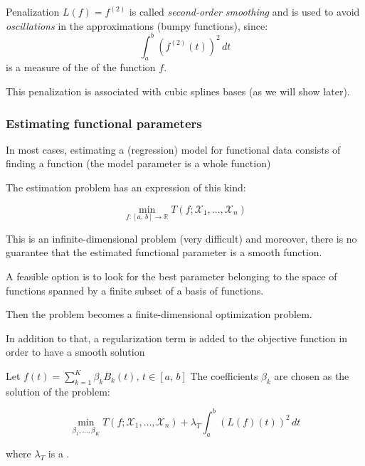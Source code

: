 Penalization $L(f) = f^{(2)}$ is called \emph{second-order smoothing} and
is used to avoid \emph{oscillations} in the approximations (bumpy functions),
since:
\begin{equation*}
    \int_{a}^{b} \left(
        f^{(2)}(t)
    \right)^2\, dt
\end{equation*}
is a measure of the  of the function $f$.

\begin{note}
    This penalization is associated with cubic splines bases (as we will show later).
\end{note}

\subsubsection{Estimating functional parameters}

In most cases, estimating a (regression) model for functional data
consists of finding a function (the model parameter is a whole function)

The estimation problem has an expression of this kind:
\begin{problem}{}{}
    \begin{equation*}
        \min_{f:[a,\,b] \to \mathds R} T(f; \mathcal X_1,\ldots,\mathcal X_n)
    \end{equation*}
\end{problem}

This is an infinite-dimensional problem (very difficult) and moreover,
there is no guarantee that the estimated functional parameter is a smooth 
function.

A feasible option is to look for the best parameter belonging to the space of functions spanned by
a finite subset of a basis of functions.

Then the problem becomes a finite-dimensional optimization problem.

In addition to that, a regularization term is added to the objective function
in order to have a smooth solution

Let $f(t) = \sum_{k=1}^K \beta_k B_k(t),\,t\in [a,\,b]$
The coefficients $\beta_k$ are chosen as the solution of the problem:
\begin{problem}{}{}
    \begin{equation*}
        \min_{\beta_1,\ldots,\beta_K} T(f; \mathcal X_1,\ldots,\mathcal X_n)
        + \lambda_T \int_{a}^{b} \left(
            L(f)(t)
        \right)^2\, dt
    \end{equation*}
\end{problem}
where $\lambda_T$ is a .

